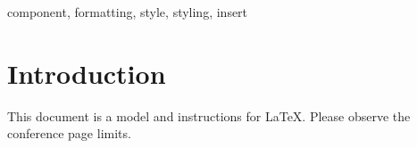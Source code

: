 \documentclass[main]{subfiles}
\begin{document}
\begin{abstract}
This document is a model and instructions for \LaTeX.
This and the IEEEtran.cls file define the components of your paper [title, text, heads, etc.]. *CRITICAL: Do Not Use Symbols, Special Characters, Footnotes, 
or Math in Paper Title or Abstract.
\end{abstract}
    
\begin{IEEEkeywords}
component, formatting, style, styling, insert
\end{IEEEkeywords}
    
\section{Introduction}
This document is a model and instructions for \LaTeX.
Please observe the conference page limits. 
    
\end{document}
